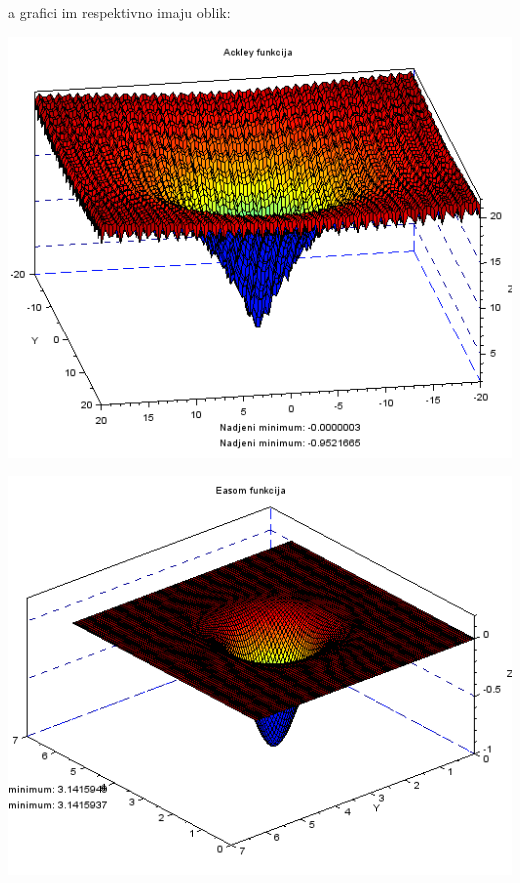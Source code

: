 \documentclass[bosnian,12pt,a4paper]{report}
\begin{document}
a grafici im respektivno imaju oblik:\\
\begin{minipage}{0.5\textwidth}
\begin{center}
   \includegraphics[scale=0.4]{ackleyfunction.png}
\end{center}
\end{minipage}
\begin{minipage}{0.5\textwidth}
\begin{center}
   \includegraphics[scale=0.5]{easomfunction.png}
\end{center}
\end{minipage}
\end{document}
